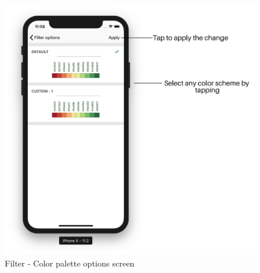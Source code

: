 \begin{itemize}
\begin{itemize}
        \begin{figure}[H]
            \centering
            \includegraphics[width=0.50\linewidth]{figures/ch2/color_scheme.png}
            \caption{\label{fig:color_scheme} Filter - Color palette  options screen}
        \end{figure}
        
    \end{itemize}

\end{itemize}




